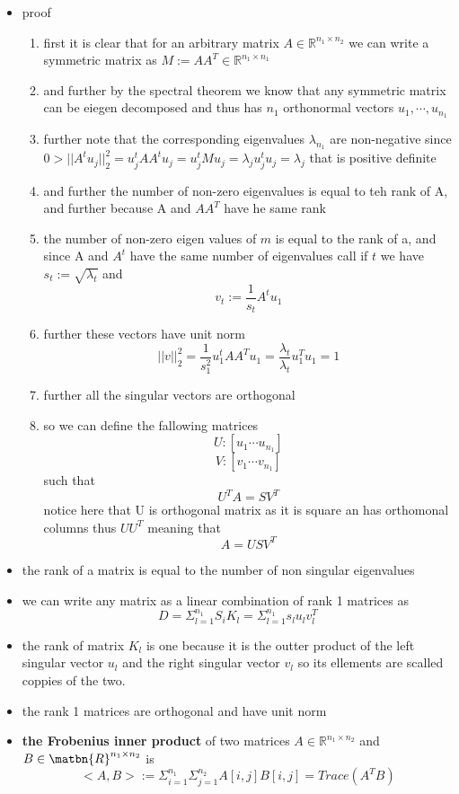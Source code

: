 \documentclass{article}
\begin{document}
\begin{itemize}
\item proof
\begin{enumerate}
    \item first it is clear that for an arbitrary matrix $A\in \mathbb{R}^{n_1\times n_2}$ we can write a symmetric matrix as $M:=AA^{T}\in \mathbb{R}^{n_1\times n_1}$
    \item and further by the spectral theorem we know that any symmetric matrix can be eiegen decomposed and thus has $n_1$ orthonormal vectors $u_1,\cdots , u_{n_1}$
    \item further note that the corresponding eigenvalues $\lambda_{n_1}$ are non-negative since $0> ||A^{t}u_{j}||_{2}^{2}=u_{j}^{t}AA^{t}u_{j}=u_{j}^{t}Mu_{j}=\lambda_{j}u_{j}^{t}u_{j}=\lambda_{j}$ that is positive definite
    \item and further the number of non-zero eigenvalues is equal to teh rank of A, and further because A and $AA^{T}$ have he same rank  
    \item the  number of non-zero eigen values of $m$ is equal to the rank of a, and since A and $A^{t}$ have the same number of eigenvalues call if $t$ we have $s_{t}:=\sqrt{\lambda_{t}}$ and $$v_{t}:=\frac{1}{s_{t}}A^tu_{1}$$
    \item further these vectors have unit norm $$||v||_{2}^{2}=\frac{1}{s_{1}^2}u_{1}^{t}AA^{T}u_{1}=\frac{\lambda _t}{\lambda_t}u_{1}^{T}u_{1}=1$$
    \item further all the singular vectors are orthogonal
    \item so we can define the fallowing matrices $$U:[u_1\cdots u_{n_1}]$$ $$V:[v_1\cdots v_{n_1}]$$ such that $$U^TA=SV^T$$
    notice here that U is orthogonal  matrix as it is square an has orthomonal columns thus $UU^{T}$ meaning that $$A=USV^T$$
\end{enumerate}
\item the rank of a matrix is equal to the number of non singular eigenvalues
\item we can write any matrix as a linear combination of rank 1 matrices as $$D=\Sigma_{l=1}^{n_1}S_{i}K_{l}=\Sigma_{l=1}^{n_1}s_{l}u_{l}v_{l}^{T}$$
\item the rank of matrix $K_{l}$ is one because it is the outter product of the left singular vector $u_{l}$ and the right singular vector $v_{l}$ so its ellements are scalled coppies of the two. 
\item the rank 1 matrices are orthogonal and have unit norm 
\item \textbf{the Frobenius inner product } of two matrices $A\in \mathbb{R}^{n_1\times n_2}$ and $B\in \matbn{R}^{n_1\times n_2}$ is $$<A,B>:=\Sigma_{i=1}^{n_1}\Sigma_{j=1}^{n_2}A[i,j]B[i,j]=Trace(A^TB)$$

\end{itemize}
\end{document}
